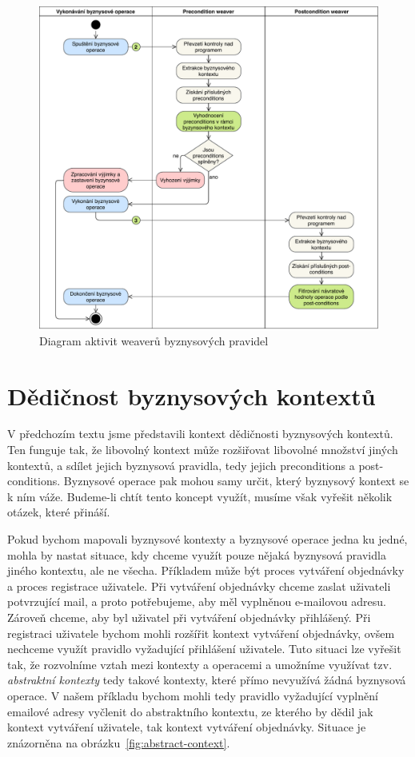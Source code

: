 \begin{figure}
    \centering
    \includegraphics[keepaspectratio=true, width=0.8\linewidth]{figures/business-rules-weaver.pdf}
    \caption{Diagram aktivit weaverů byznysov\'ych pravidel}
    \label{fig:business-rules-weaver}
\end{figure} %

\section{Dědičnost byznysových kontextů}\label{sec:context-inheritance}

V předchozím textu jsme představili kontext dědičnosti byznysových kontextů. Ten funguje tak,
že libovolný kontext může rozšiřovat libovolné množství jiných kontextů, a sdílet jejich
byznysová pravidla, tedy jejich preconditions a post-conditions. Byznysové operace
pak mohou samy určit, který byznysový kontext se k ním váže. Budeme-li chtít tento
koncept využít, musíme však vyřešit několik otázek, které přináší.

Pokud bychom mapovali byznysové kontexty a byznysové operace jedna ku jedné, mohla by
nastat situace, kdy chceme využít pouze nějaká byznysová pravidla jiného kontextu,
ale ne všecha. Příkladem může být proces vytváření objednávky a proces registrace uživatele.
Při vytváření objednávky chceme zaslat uživateli potvrzující mail, a proto potřebujeme, aby
měl vyplněnou e-mailovou adresu. Zároveň chceme, aby byl uživatel při vytváření objednávky přihlášený.
Při registraci uživatele bychom mohli rozšířit kontext vytváření objednávky, ovšem nechceme využít pravidlo
vyžadující přihlášení uživatele. Tuto situaci lze vyřešit tak, že rozvolníme vztah mezi kontexty a operacemi
a umožníme využívat tzv. \textit{abstraktní kontexty} \textendash\xspace tedy takové kontexty, které
přímo nevyužívá žádná byznysová operace. V našem příkladu bychom mohli tedy pravidlo vyžadující vyplnění
emailové adresy vyčlenit do abstraktního kontextu, ze kterého by dědil jak kontext vytváření uživatele,
tak kontext vytváření objednávky. Situace je znázorněna na obrázku~\ref{fig:abstract-context}.

